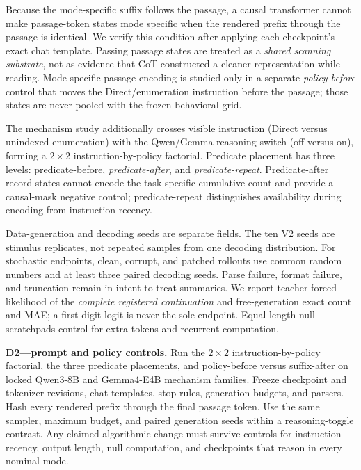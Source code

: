 Because the mode-specific suffix follows the passage, a causal transformer
cannot make passage-token states mode specific when the rendered prefix
through the passage is identical. We verify this condition after applying
each checkpoint's exact chat template. Passing passage states are treated as
a \emph{shared scanning substrate}, not as evidence that CoT constructed a
cleaner representation while reading. Mode-specific passage encoding is
studied only in a separate \emph{policy-before} control that moves the
Direct/enumeration instruction before the passage; those states are never
pooled with the frozen behavioral grid.

The mechanism study additionally crosses visible instruction (Direct versus
unindexed enumeration) with the Qwen/Gemma reasoning switch (off versus on),
forming a \(2\times2\) instruction-by-policy factorial. Predicate placement
has three levels: predicate-before, \emph{predicate-after}, and
\emph{predicate-repeat}. Predicate-after record states cannot encode the
task-specific cumulative count and provide a causal-mask negative control;
predicate-repeat distinguishes availability during encoding from instruction
recency.

Data-generation and decoding seeds are separate fields. The ten V2 seeds are
stimulus replicates, not repeated samples from one decoding distribution. For
stochastic endpoints, clean, corrupt, and patched rollouts use common random
numbers and at least three paired decoding seeds. Parse failure, format
failure, and truncation remain in intent-to-treat summaries. We report
teacher-forced likelihood of the \emph{complete registered continuation} and
free-generation exact count and MAE; a first-digit logit is never the sole
endpoint. Equal-length null scratchpads control for extra tokens and recurrent
computation.

\begin{todobox}
\textbf{D2---prompt and policy controls.}
Run the \(2\times2\) instruction-by-policy factorial, the three predicate
placements, and policy-before versus suffix-after on locked Qwen3-8B and
Gemma4-E4B mechanism families. Freeze checkpoint and tokenizer revisions, chat
templates, stop rules, generation budgets, and parsers. Hash every rendered
prefix through the final passage token. Use the same sampler, maximum budget,
and paired generation seeds within a reasoning-toggle contrast. Any claimed
algorithmic change must survive controls for instruction recency, output
length, null computation, and checkpoints that reason in every nominal mode.
\end{todobox}

